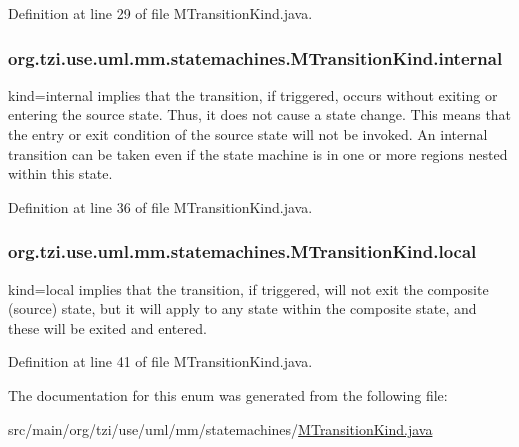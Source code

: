 Definition at line 29 of file M\-Transition\-Kind.\-java.

\hypertarget{enumorg_1_1tzi_1_1use_1_1uml_1_1mm_1_1statemachines_1_1_m_transition_kind_adb08a4006493437022aa024ced11cb36}{
\subsubsection[{internal}]{\setlength{\rightskip}{0pt plus 5cm}org.\-tzi.\-use.\-uml.\-mm.\-statemachines.\-M\-Transition\-Kind.\-internal}}\label{enumorg_1_1tzi_1_1use_1_1uml_1_1mm_1_1statemachines_1_1_m_transition_kind_adb08a4006493437022aa024ced11cb36}
kind=internal implies that the transition, if triggered, occurs without exiting or entering the source state. Thus, it does not cause a state change. This means that the entry or exit condition of the source state will not be invoked. An internal transition can be taken even if the state machine is in one or more regions nested within this state. 

Definition at line 36 of file M\-Transition\-Kind.\-java.

\hypertarget{enumorg_1_1tzi_1_1use_1_1uml_1_1mm_1_1statemachines_1_1_m_transition_kind_a0883cda1892dc0e16cfae230e061d923}{
\subsubsection[{local}]{\setlength{\rightskip}{0pt plus 5cm}org.\-tzi.\-use.\-uml.\-mm.\-statemachines.\-M\-Transition\-Kind.\-local}}\label{enumorg_1_1tzi_1_1use_1_1uml_1_1mm_1_1statemachines_1_1_m_transition_kind_a0883cda1892dc0e16cfae230e061d923}
kind=local implies that the transition, if triggered, will not exit the composite (source) state, but it will apply to any state within the composite state, and these will be exited and entered. 

Definition at line 41 of file M\-Transition\-Kind.\-java.



The documentation for this enum was generated from the following file\-:\begin{DoxyCompactItemize}
\item 
src/main/org/tzi/use/uml/mm/statemachines/\hyperlink{_m_transition_kind_8java}{M\-Transition\-Kind.\-java}\end{DoxyCompactItemize}
